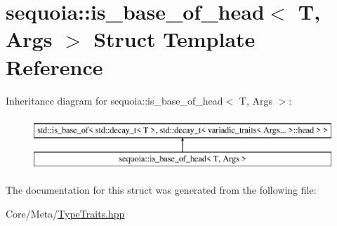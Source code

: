 \hypertarget{structsequoia_1_1is__base__of__head}{}\section{sequoia\+::is\+\_\+base\+\_\+of\+\_\+head$<$ T, Args $>$ Struct Template Reference}
\label{structsequoia_1_1is__base__of__head}
Inheritance diagram for sequoia\+::is\+\_\+base\+\_\+of\+\_\+head$<$ T, Args $>$\+:\begin{figure}[H]
\begin{center}
\leavevmode
\includegraphics[height=2.000000cm]{structsequoia_1_1is__base__of__head}
\end{center}
\end{figure}


The documentation for this struct was generated from the following file\+:\begin{DoxyCompactItemize}
\item 
Core/\+Meta/\mbox{\hyperlink{_type_traits_8hpp}{Type\+Traits.\+hpp}}\end{DoxyCompactItemize}
